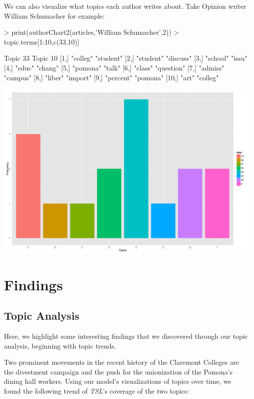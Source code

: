 \documentclass[a4paper]{article}
\begin{document}
We can also visualize what topics each author writes about. Take Opinion writer William Schumacher for example: 

\begin{Schunk}
\begin{Sinput}
> print(authorChart2(articles,'William Schumacher',2))
> topic.terms[1:10,c(33,10)]
\end{Sinput}
\begin{Soutput}
      Topic 33  Topic 10  
 [1,] "colleg"  "student" 
 [2,] "student" "discuss" 
 [3,] "school"  "issu"    
 [4,] "educ"    "chang"   
 [5,] "pomona"  "talk"    
 [6,] "class"   "question"
 [7,] "admiss"  "campus"  
 [8,] "liber"   "import"  
 [9,] "percent" "pomona"  
[10,] "art"     "colleg"  
\end{Soutput}
\end{Schunk}
\includegraphics{FinalProject-006}


\section{Findings}

\subsection{Topic Analysis}

Here, we highlight some interesting findings that we discovered through our topic analysis, beginning with topic trends.

Two prominent movements in the recent history of the Claremont Colleges are the divestment campaign and the push for the unionization of the Pomona's dining hall workers. Using our model's visualizations of topics over time, we found the following trend of \textit{TSL}'s coverage of the two topics:
\end{document}
